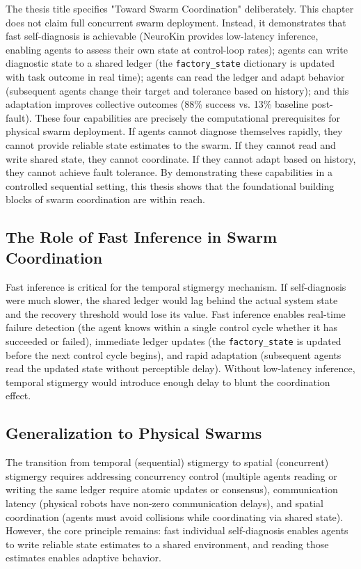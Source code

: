 \documentclass[12pt,a4paper,oneside]{report}
\begin{document}
The thesis title specifies "Toward Swarm Coordination" deliberately. This chapter does not claim full concurrent swarm deployment. Instead, it demonstrates that fast self-diagnosis is achievable (NeuroKin provides low-latency inference, enabling agents to assess their own state at control-loop rates); agents can write diagnostic state to a shared ledger (the \texttt{factory\_state} dictionary is updated with task outcome in real time); agents can read the ledger and adapt behavior (subsequent agents change their target and tolerance based on history); and this adaptation improves collective outcomes (88\% success vs. 13\% baseline post-fault). These four capabilities are precisely the computational prerequisites for physical swarm deployment. If agents cannot diagnose themselves rapidly, they cannot provide reliable state estimates to the swarm. If they cannot read and write shared state, they cannot coordinate. If they cannot adapt based on history, they cannot achieve fault tolerance. By demonstrating these capabilities in a controlled sequential setting, this thesis shows that the foundational building blocks of swarm coordination are within reach.

\subsection{The Role of Fast Inference in Swarm Coordination}
\label{subsec:the_role_of_fast_inference_in_swarm_coordination}

Fast inference is critical for the temporal stigmergy mechanism. If self-diagnosis were much slower, the shared ledger would lag behind the actual system state and the recovery threshold would lose its value. Fast inference enables real-time failure detection (the agent knows within a single control cycle whether it has succeeded or failed), immediate ledger updates (the \texttt{factory\_state} is updated before the next control cycle begins), and rapid adaptation (subsequent agents read the updated state without perceptible delay). Without low-latency inference, temporal stigmergy would introduce enough delay to blunt the coordination effect.

\subsection{Generalization to Physical Swarms}
\label{subsec:generalization_to_physical_swarms}

The transition from temporal (sequential) stigmergy to spatial (concurrent) stigmergy requires addressing concurrency control (multiple agents reading or writing the same ledger require atomic updates or consensus), communication latency (physical robots have non-zero communication delays), and spatial coordination (agents must avoid collisions while coordinating via shared state). However, the core principle remains: fast individual self-diagnosis enables agents to write reliable state estimates to a shared environment, and reading those estimates enables adaptive behavior.
\end{document}
